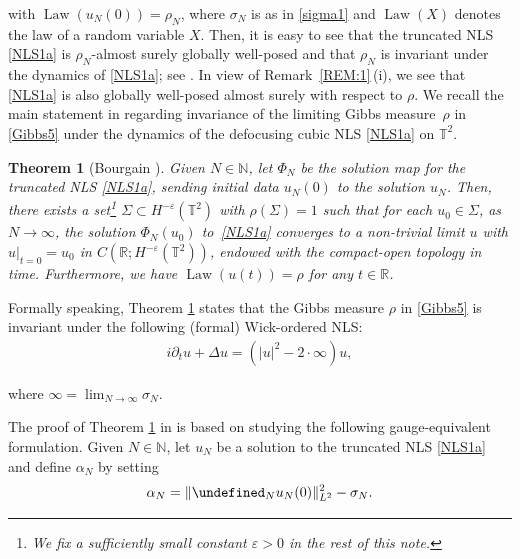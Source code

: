 \documentclass[%
11pt,  reqno]{amsart}
\newtheorem{theorem}{Theorem} [section]
\newcommand{\1}{\hspace{0.2mm}\text{I}\hspace{0.2mm}}
\newcommand{\noi}{\noindent}
\newcommand{\R}{\mathbb{R}}
\newcommand{\T}{\mathbb{T}}
\let\P= \undefined
\newcommand{\P}{\mathbf{P}}
\newcommand{\al}{\alpha}
\newcommand{\eps}{\varepsilon}
\newcommand{\s}{\sigma}
\newcommand{\Si}{\Sigma}
\newcommand{\dt}{\partial_t}
\newcommand{\N}{\mathbb{N}}
\numberwithin{equation}{section}
\numberwithin{theorem}{section}
\DeclareMathOperator{\Law}{Law}
\begin{document}
\noi
with $\Law(u_N(0)) = \rho_N$, 
where $\s_N$ is as in \eqref{sigma1}
and $\Law(X)$ denotes the law of a random variable $X$.
Then, it is easy to see that the truncated NLS \eqref{NLS1a} is $\rho_N$-almost surely globally well-posed
and that $\rho_N$ is invariant under
the dynamics of \eqref{NLS1a};
see
\cite[Lemma 5.1]{OTh1}.
In view of Remark~\ref{REM:1}\,(i), 
we see that 
\eqref{NLS1a} is also  globally well-posed
almost surely
with respect to $\rho$.
We  recall 
the main statement in \cite{BO96} regarding invariance of 
the limiting Gibbs measure~$\rho$ in \eqref{Gibbs5} under the dynamics
of the defocusing cubic NLS \eqref{NLS1a} on $\T^2$. 




\begin{theorem}[Bourgain \cite{BO96}]\label{THM:0}
Given  $N \in \N$, 
let $\Phi_N$ be the solution map for the truncated NLS \eqref{NLS1a}, 
sending initial data $u_N(0)$ to the solution $u_N$. 
Then, there exists a set\footnote{We fix a sufficiently small constant $\eps > 0$ in the rest of this note.}
 $\Si \subset H^{-\eps}(\T^2)$
with $\rho(\Si) = 1$ such that 
for each $u_0 \in \Si$, 
as $N \to \infty$, 
the solution $\Phi_N(u_0)$
to~\eqref{NLS1a}
converges 
to a non-trivial limit
$u$ with $u|_{t=0} = u_0$
in 
$C(\R;  H^{-\eps}(\T^2))$, 
endowed with the compact-open
topology in time.
Furthermore, we have $\Law(u(t)) = \rho$
for any $t \in \R$.







\end{theorem}





Formally speaking, 
Theorem \ref{THM:0}
states that the Gibbs measure $\rho$ in \eqref{Gibbs5}
is invariant under the following (formal) Wick-ordered NLS:
\begin{align*}
i \dt u +  \Delta u =  ( | u|^{2}  - 2\cdot \infty)   u, 
\end{align*}

\noi
where $\infty = \lim_{N\to \infty}\s_N$.




The proof of Theorem \ref{THM:0} in \cite{BO96} is based
on studying the following gauge-equivalent formulation.
Given $N \in \N$, 
let  $u_N$ be a solution to the truncated NLS \eqref{NLS1a}
and
define $\al_N$ by setting 
\begin{align}
\al_N = \|\P_N u_N(0)\|_{L^2}^2 - \s_N.
\label{C1}
\end{align}
\end{document}
